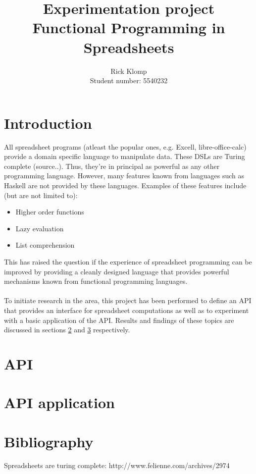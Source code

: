 \documentclass[10pt,a4paper]{article}
\begin{document}
\author{Rick Klomp\\Student number: 5540232}
\title{Experimentation project\\Functional Programming in Spreadsheets}
\maketitle
\pagebreak

\section{Introduction}
All spreadsheet programs (atleast the popular ones, e.g. Excell, libre-office-calc) provide a
domain specific language to manipulate data. These DSLs are Turing complete (source..). Thus,
they're in principal as powerful as any other programming language.
However, many features known from languages such as Haskell are not provided by these languages.
Examples of these features include (but are not limited to):
\begin{itemize}
\item Higher order functions
\item Lazy evaluation
\item List comprehension
\end{itemize}
This has raised the question if the experience of spreadsheet programming can be improved by
providing a cleanly designed language that provides powerful mechanisms known from functional
programming languages.
\\\\
To initiate research in the area, this project has been performed to define an API that provides
an interface for spreadsheet computations as well as to experiment with a basic application of
the API. Results and findings of these topics are discussed in sections \ref{API} and
\ref{API application} respectively.

\section{API}
\label{API}

\section{API application}
\label{API application}


\section*{Bibliography}
Spreadsheets are turing complete: http://www.felienne.com/archives/2974
\end{document}
